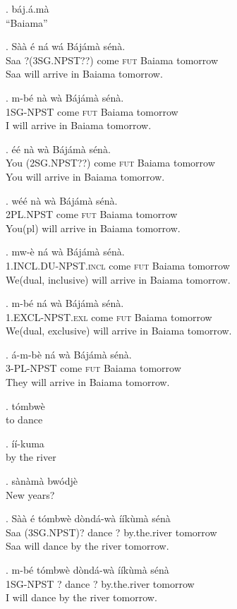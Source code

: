 \documentclass{assets/fieldnotes}
\begin{document}
{

\ex. báj.á.mà\\
``Baiama''

\exg. Sàà é ná wá Bájámà sénà.\\
Saa ?(3SG.NPST??) come \textsc{fut} Baiama tomorrow\\
Saa will arrive in Baiama tomorrow. 


\exg. m-bé nà wà Bájámà sénà.\\
1\textsc{SG-NPST} come \textsc{fut} Baiama tomorrow\\
I will arrive in Baiama tomorrow.

\exg. éé nà wà Bájámà sénà.\\
You (2SG.NPST??) come \textsc{fut} Baiama tomorrow\\
You will arrive in Baiama tomorrow.

\exg. wéé nà wà Bájámà sénà.\\
2\textsc{PL.NPST} come \textsc{fut} Baiama tomorrow\\
You(pl) will arrive in Baiama tomorrow.

\exg. mw-è ná wà Bájámà sénà.\\
1.\textsc{INCL.DU-NPST}.\textsc{incl} come \textsc{fut} Baiama tomorrow\\
We(dual, inclusive) will arrive in Baiama tomorrow.

\exg. m-bé ná wà Bájámà sénà.\\
1.\textsc{EXCL-NPST}.\textsc{exl} come \textsc{fut} Baiama tomorrow\\
We(dual, exclusive) will arrive in Baiama tomorrow.

\exg. á-m-bè ná wà Bájámà sénà.\\
3-\textsc{PL-NPST} come \textsc{fut} Baiama tomorrow\\
They will arrive in Baiama tomorrow.


\ex. tómbwè\\
to dance

\ex. íí-kuma\\
by the river

\ex. sànàmà bwódjè\\
New years?

\exg. Sàà é tómbwè dòndá-wà ííkùmà sénà\\
Saa (3SG.NPST)? dance ? by.the.river tomorrow\\
Saa will dance by the river tomorrow. 

\exg. m-bé tómbwè dòndá-wà ííkùmà sénà\\
1\textsc{SG-NPST} ? dance ? by.the.river tomorrow\\
I will dance by the river tomorrow.\\

}
\end{document}
